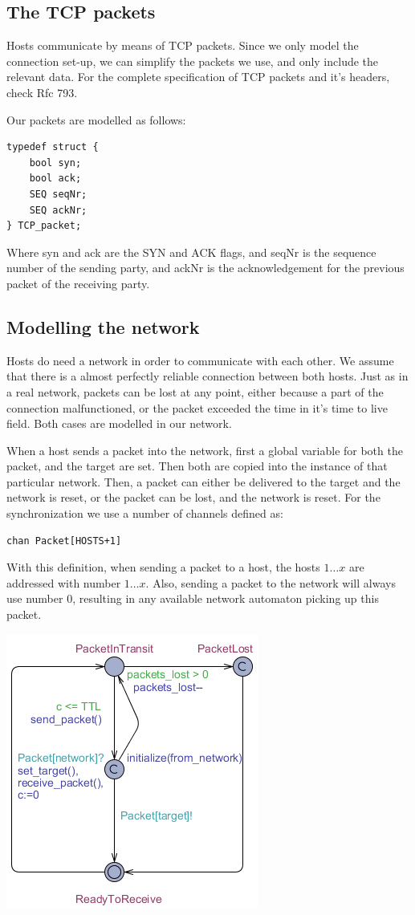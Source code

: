 \documentclass[twocolumn]{article}
\begin{document}
\subsection{The TCP packets}
Hosts communicate by means of TCP packets. Since we only model the connection set-up, we can simplify the packets we use, and only include the relevant data. For the complete specification of TCP packets and it's headers, check Rfc 793.

Our packets are modelled as follows:
\begin{verbatim}
typedef struct {
    bool syn;
    bool ack;
    SEQ seqNr;
    SEQ ackNr;
} TCP_packet;
\end{verbatim}
Where syn and ack are the SYN and ACK flags, and seqNr is the sequence number of the sending party, and ackNr is the acknowledgement for the previous packet of the receiving party.

\subsection{Modelling the network}
Hosts do need a network in order to communicate with each other. We assume that there is a almost perfectly reliable connection between both hosts. Just as in a real network, packets can be lost at any point, either because a part of the connection malfunctioned, or the packet exceeded the time in it's time to live field. Both cases are modelled in our network.

When a host sends a packet into the network, first a global variable for both the packet, and the target are set. Then both are copied into the instance of that particular network. Then, a packet can either be delivered to the target and the network is reset, or the packet can be lost, and the network is reset. For the synchronization we use a number of channels defined as:
\begin{verbatim}chan Packet[HOSTS+1]
\end{verbatim}
With this definition, when sending a packet to a host, the hosts $1\ldots x$ are addressed with number $1\ldots x$. Also, sending a packet to the network will always use number 0, resulting in any available network automaton picking up this packet.

\includegraphics[scale=0.85]{network_model}
\end{document}
